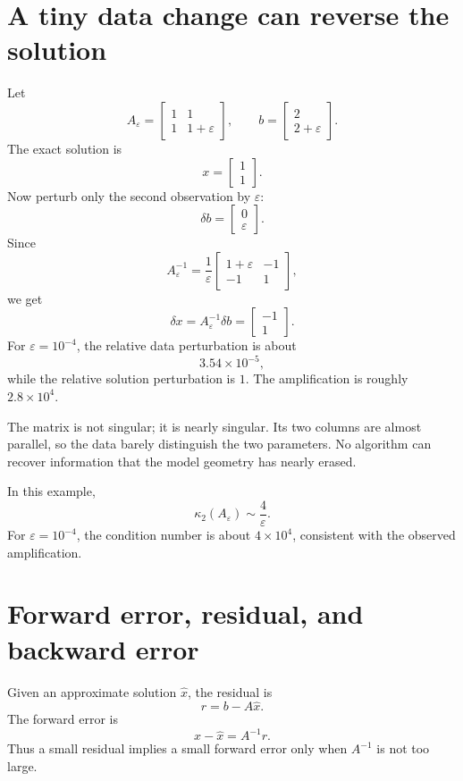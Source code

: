 \section{A tiny data change can reverse the solution}

Let
\[
  A_\varepsilon=
  \begin{bmatrix}
    1&1\\
    1&1+\varepsilon
  \end{bmatrix},
  \qquad
  b=
  \begin{bmatrix}
    2\\
    2+\varepsilon
  \end{bmatrix}.
\]
The exact solution is
\[
  x=
  \begin{bmatrix}1\\1\end{bmatrix}.
\]
Now perturb only the second observation by \(\varepsilon\):
\[
  \delta b=
  \begin{bmatrix}0\\\varepsilon\end{bmatrix}.
\]
Since
\[
  A_\varepsilon^{-1}
  =\frac1\varepsilon
  \begin{bmatrix}
    1+\varepsilon&-1\\
    -1&1
  \end{bmatrix},
\]
we get
\[
  \delta x=A_\varepsilon^{-1}\delta b
  =
  \begin{bmatrix}-1\\1\end{bmatrix}.
\]
For \(\varepsilon=10^{-4}\), the relative data perturbation is about
\[
  3.54\times10^{-5},
\]
while the relative solution perturbation is \(1\).  The amplification is roughly \(2.8\times10^4\).

The matrix is not singular; it is nearly singular.  Its two columns are almost parallel, so the data barely distinguish the two parameters.  No algorithm can recover information that the model geometry has nearly erased.

In this example,
\[
  \kappa_2(A_\varepsilon)\sim\frac4\varepsilon.
\]
For \(\varepsilon=10^{-4}\), the condition number is about \(4\times10^4\), consistent with the observed amplification.

\section{Forward error, residual, and backward error}

Given an approximate solution \(\widehat x\), the residual is
\[
  r=b-A\widehat x.
\]
The forward error is
\[
  x-\widehat x=A^{-1}r.
\]
Thus a small residual implies a small forward error only when \(A^{-1}\) is not too large.

